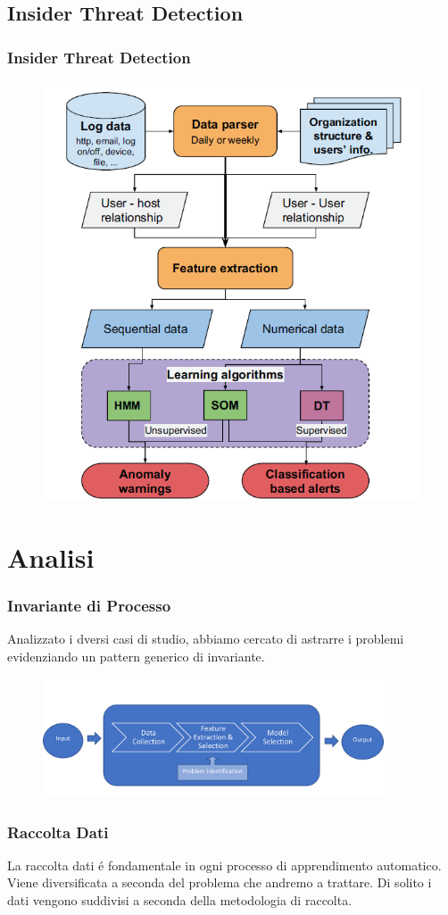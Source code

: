 \documentclass[xcolor=dvipsnames]{beamer}
\begin{document}
\subsection{Insider Threat Detection}
\begin{frame}
    \frametitle{Insider Threat Detection}
    \begin{figure}
        \includegraphics[width=.60\textwidth,height=.80\textheight]{workflowIntrusionThreat.png}
    \end{figure}
\end{frame}

\section{Analisi}

\begin{frame}
    \frametitle{Invariante di Processo}
    Analizzato i dversi casi di studio, abbiamo cercato di astrarre i problemi evidenziando un pattern generico di invariante.
    \begin{figure}[htbp]
        \includegraphics[width=0.9\textwidth]{Immagine3.png}
    \end{figure}
\end{frame}

\begin{frame}
    \frametitle{Raccolta Dati}
    La raccolta dati é fondamentale in ogni processo di apprendimento automatico.
    Viene diversificata a seconda del problema che andremo a trattare.
    Di solito i dati vengono suddivisi a seconda della \alert{metodologia di raccolta}.
\end{frame}
\end{document}
